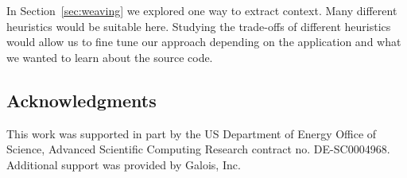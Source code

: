 In Section~\ref{sec:weaving} we explored one way to extract context. Many
different heuristics would be suitable here. Studying the trade-offs of
different heuristics would allow us to fine tune our approach depending on the
application and what we wanted to learn about the source code.

\subsection{Acknowledgments}

This work was supported in part by the US Department of
Energy Office of Science, Advanced Scientific Computing Research
contract no. DE-SC0004968.  Additional support was provided by Galois,
Inc.
